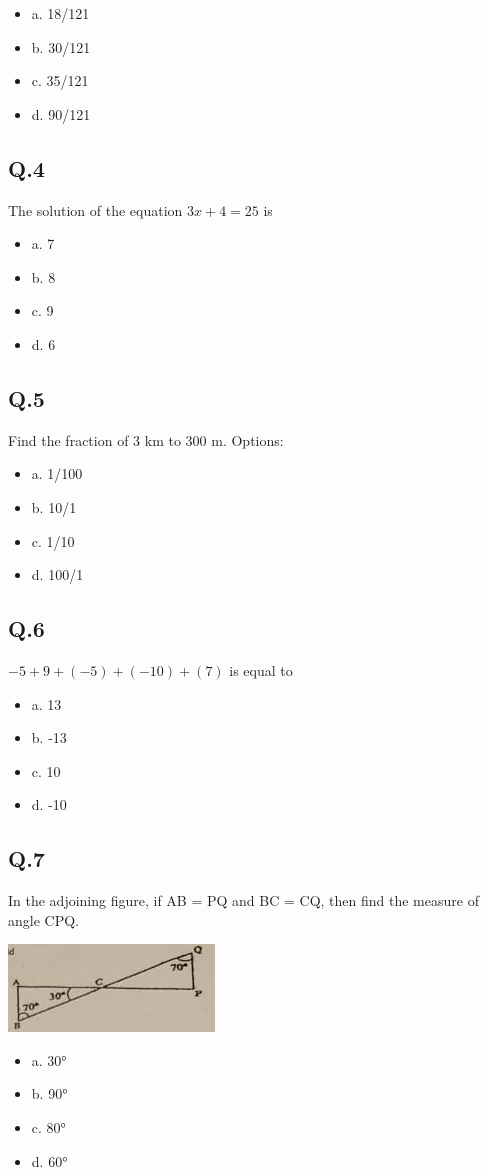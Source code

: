 \documentclass[11pt]{article}
\begin{document}
\begin{itemize}
\item a. 18/121
\item b. 30/121
\item c. 35/121
\item d. 90/121
\end{itemize}
\subsection*{Q.4}
\label{sec:org81709ba}
The solution of the equation \(3x+4=25\) is
\begin{itemize}
\item a. 7
\item b. 8
\item c. 9
\item d. 6
\end{itemize}
\subsection*{Q.5}
\label{sec:org6ad17ca}
Find the fraction of 3 km to 300 m.
Options:
\begin{itemize}
\item a. 1/100
\item b. 10/1
\item c. 1/10
\item d. 100/1
\end{itemize}
\subsection*{Q.6}
\label{sec:org9e4d866}
\(-5+9+(-5)+(-10)+(7)\) is equal to
\begin{itemize}
\item a. 13
\item b. -13
\item c. 10
\item d. -10
\end{itemize}
\subsection*{Q.7}
\label{sec:orga268f8e}
In the adjoining figure, if AB = PQ and BC = CQ, then find the measure of angle CPQ.
\begin{center}
\includegraphics[width=.9\linewidth]{./maths7.png}
\end{center}
\begin{itemize}
\item a. 30°
\item b. 90°
\item c. 80°
\item d. 60°
\end{itemize}
\end{document}
